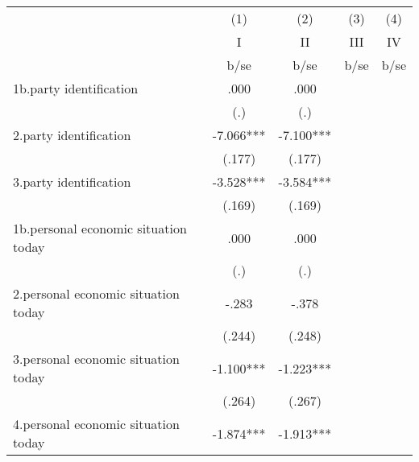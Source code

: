 {
\def\sym#1{\ifmmode^{#1}\else\(^{#1}\)\fi}
\begin{tabular}{l*{4}{c}}
\hline\hline
                                                  &\multicolumn{1}{c}{(1)}&\multicolumn{1}{c}{(2)}&\multicolumn{1}{c}{(3)}&\multicolumn{1}{c}{(4)}\\
                                                  &\multicolumn{1}{c}{I}&\multicolumn{1}{c}{II}&\multicolumn{1}{c}{III}&\multicolumn{1}{c}{IV}\\
                                                  &        b/se   &        b/se   &        b/se   &        b/se   \\
\hline
1b.party identification                           &        .000   &        .000   &               &               \\
                                                  &         (.)   &         (.)   &               &               \\
2.party identification                            &      -7.066***&      -7.100***&               &               \\
                                                  &      (.177)   &      (.177)   &               &               \\
3.party identification                            &      -3.528***&      -3.584***&               &               \\
                                                  &      (.169)   &      (.169)   &               &               \\
1b.personal economic situation today              &        .000   &        .000   &               &               \\
                                                  &         (.)   &         (.)   &               &               \\
2.personal economic situation today               &       -.283   &       -.378   &               &               \\
                                                  &      (.244)   &      (.248)   &               &               \\
3.personal economic situation today               &      -1.100***&      -1.223***&               &               \\
                                                  &      (.264)   &      (.267)   &               &               \\
4.personal economic situation today               &      -1.874***&      -1.913***&               &               \\

\end{tabular}}
